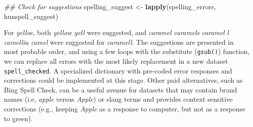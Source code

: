 \documentclass[man]{apa6}
\newenvironment{Shaded}{\begin{snugshade}}{\end{snugshade}}
\newcommand{\CommentTok}[1]{\textcolor[rgb]{0.56,0.35,0.01}{\textit{#1}}}
\newcommand{\ControlFlowTok}[1]{\textcolor[rgb]{0.13,0.29,0.53}{\textbf{#1}}}
\newcommand{\DecValTok}[1]{\textcolor[rgb]{0.00,0.00,0.81}{#1}}
\newcommand{\KeywordTok}[1]{\textcolor[rgb]{0.13,0.29,0.53}{\textbf{#1}}}
\newcommand{\NormalTok}[1]{#1}
\newcommand{\OperatorTok}[1]{\textcolor[rgb]{0.81,0.36,0.00}{\textbf{#1}}}
\newcommand{\StringTok}[1]{\textcolor[rgb]{0.31,0.60,0.02}{#1}}
\begin{document}
\begin{Shaded}
\begin{Highlighting}[]
\CommentTok{## Check for suggestions}
\NormalTok{spelling_suggest <-}\StringTok{ }\KeywordTok{lapply}\NormalTok{(spelling_errors, hunspell_suggest)}
\end{Highlighting}
\end{Shaded}

\normalsize

For \emph{yelloe}, both \emph{yellow yell} were suggested, and \emph{caramel caramels caramel l camellia camel} were suggested for \emph{caramell}. The suggestions are presented in most probable order, and using a few loops with the substitute (\texttt{gsub()}) function, we can replace all errors with the most likely replacement in a new dataset \texttt{spell\_checked}. A specialized dictionary with pre-coded error responses and corrections could be implemented at this stage. Other paid alternatives, such as Bing Spell Check, can be a useful avenue for datasets that may contain brand names (i.e, \emph{apple} versus \emph{Apple}) or slang terms and provides context sensitive corrections (e.g., keeping \emph{Apple} as a response to computer, but not as a response to green).

\scriptsize

\begin{Shaded}
\end{Shaded}
\end{document}
